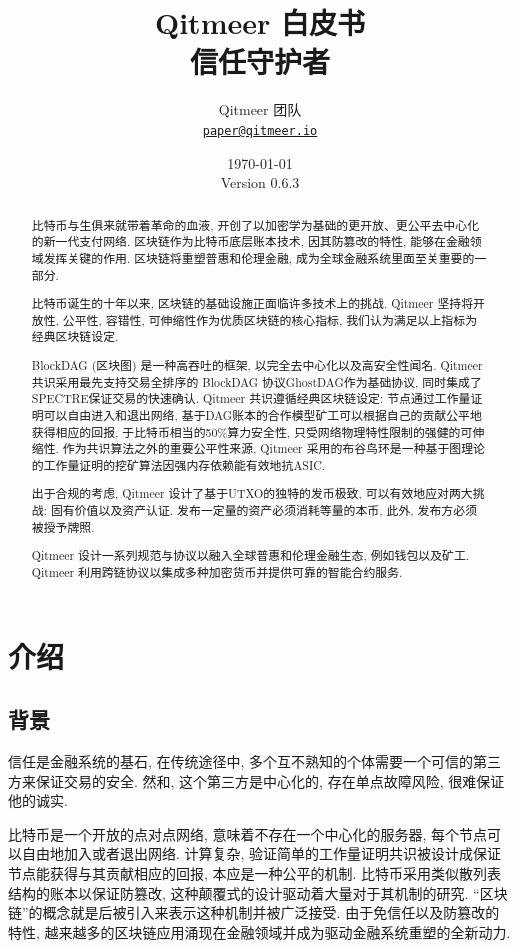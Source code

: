 \documentclass[a4paper,11pt]{article}
\title{\LARGE Qitmeer 白皮书\\
	\Large 信任守护者}
\author{
	Qitmeer 团队\\
		\small\href{mailto:paper@qitmeer.io}
			{\nolinkurl{paper@qitmeer.io}}
	}
\date{\today\\\small Version 0.6.3}
\newcommand{\watermark}[3]{\AddToShipoutPictureBG{
	\parbox[b][\paperheight]{\paperwidth}{
		\vfill%
		\centering%
	\tikz[remember picture, overlay]%
	  \node [rotate = #1, scale = #2] at (current page.center)%
	      {\textcolor{gray!80!cyan!30}{#3}};
	  \vfill}}}
\begin{document}
\clearpage
\pagestyle{plain}

\maketitle


\begin{abstract}
比特币\cite{bitcoin}与生俱来就带着革命的血液, 开创了以加密学为基础的更开放、更公平去中心化的新一代支付网络. 区块链作为比特币底层账本技术, 因其防篡改的特性, 能够在金融领域发挥关键的作用. 区块链将重塑普惠和伦理金融, 成为全球金融系统里面至关重要的一部分.

比特币诞生的十年以来, 区块链的基础设施正面临许多技术上的挑战. Qitmeer 坚持将开放性, 公平性, 容错性, 可伸缩性作为优质区块链的核心指标, 我们认为满足以上指标为经典区块链设定.

BlockDAG (区块图) 是一种高吞吐的框架, 以完全去中心化以及高安全性闻名. Qitmeer共识采用最先支持交易全排序的 BlockDAG 协议GhostDAG作为基础协议, 同时集成了SPECTRE保证交易的快速确认. Qitmeer 共识遵循经典区块链设定: 节点通过工作量证明可以自由进入和退出网络, 基于DAG账本的合作模型矿工可以根据自己的贡献公平地获得相应的回报, 于比特币相当的50\%算力安全性, 只受网络物理特性限制的强健的可伸缩性. 作为共识算法之外的重要公平性来源, Qitmeer 采用的布谷鸟环是一种基于图理论的工作量证明的挖矿算法因强内存依赖能有效地抗ASIC. 

出于合规的考虑, Qitmeer 设计了基于UTXO的独特的发币极致, 可以有效地应对两大挑战: 固有价值以及资产认证. 发布一定量的资产必须消耗等量的本币, 此外, 发布方必须被授予牌照.

Qitmeer 设计一系列规范与协议以融入全球普惠和伦理金融生态, 例如钱包以及矿工. Qitmeer 利用跨链协议以集成多种加密货币并提供可靠的智能合约服务.

\end{abstract}

\section{介绍}

\subsection{背景}

信任是金融系统的基石, 在传统途径中, 多个互不熟知的个体需要一个可信的第三方来保证交易的安全. 然和, 这个第三方是中心化的, 存在单点故障风险, 很难保证他的诚实.


比特币是一个开放的点对点网络, 意味着不存在一个中心化的服务器, 每个节点可以自由地加入或者退出网络. 计算复杂, 验证简单的工作量证明共识被设计成保证节点能获得与其贡献相应的回报, 本应是一种公平的机制. 比特币采用类似散列表结构的账本以保证防篡改, 这种颠覆式的设计驱动着大量对于其机制的研究. “区块链”的概念就是后被引入来表示这种机制并被广泛接受. 由于免信任以及防篡改的特性, 越来越多的区块链应用涌现在金融领域并成为驱动金融系统重塑的全新动力.
\end{document}
